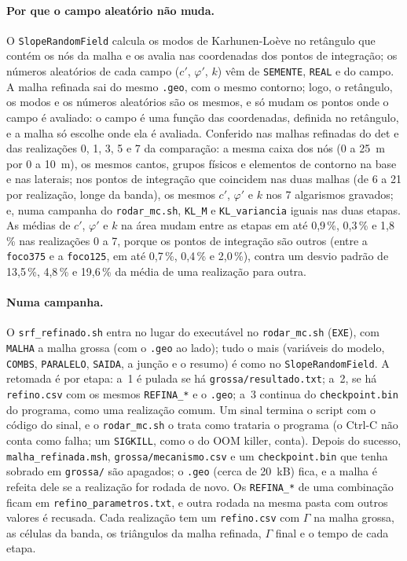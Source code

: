 \paragraph{Por que o campo aleatório não muda.} O \texttt{SlopeRandomField} calcula os modos de Karhunen-Loève no
retângulo que contém os nós da malha e os avalia nas coordenadas dos pontos de integração; os números aleatórios de
cada campo ($c'$, $\varphi'$, $k$) vêm de \texttt{SEMENTE}, \texttt{REAL} e do campo. A malha refinada sai do mesmo
\texttt{.geo}, com o mesmo contorno; logo, o retângulo, os modos e os números aleatórios são os mesmos, e só mudam os
pontos onde o campo é avaliado: o campo é uma função das coordenadas, definida no retângulo, e a malha só escolhe onde
ela é avaliada. Conferido nas malhas refinadas do det e das realizações 0, 1, 3, 5 e 7 da comparação: a mesma caixa dos
nós (0 a 25~m por 0 a 10~m), os mesmos cantos, grupos físicos e elementos de contorno na base e nas laterais; nos pontos
de integração que coincidem nas duas malhas (de 6 a 21 por realização, longe da banda), os mesmos $c'$, $\varphi'$ e
$k$ nos 7 algarismos gravados; e, numa campanha do \texttt{rodar\_mc.sh}, \texttt{KL\_M} e \texttt{KL\_variancia}
iguais nas duas etapas. As médias de $c'$, $\varphi'$ e $k$ na área mudam entre as etapas em até 0,9\,\%, 0,3\,\% e
1,8\,\% nas realizações 0 a 7, porque os pontos de integração são outros (entre a \texttt{foco375} e a
\texttt{foco125}, em até 0,7\,\%, 0,4\,\% e 2,0\,\%), contra um desvio padrão de 13,5\,\%, 4,8\,\% e 19,6\,\% da
média de uma realização para outra.

\paragraph{Numa campanha.} O \texttt{srf\_refinado.sh} entra no lugar do executável no \texttt{rodar\_mc.sh}
(\texttt{EXE}), com \texttt{MALHA} a malha grossa (com o \texttt{.geo} ao lado); tudo o mais (variáveis do modelo,
\texttt{COMBS}, \texttt{PARALELO}, \texttt{SAIDA}, a junção e o resumo) é como no \texttt{SlopeRandomField}. A
retomada é por etapa: a~1 é pulada se há \texttt{grossa/resultado.txt}; a~2, se há \texttt{refino.csv} com os mesmos
\texttt{REFINA\_*} e o \texttt{.geo}; a~3 continua do \texttt{checkpoint.bin} do programa, como uma realização comum.
Um sinal termina o script com o código do sinal, e o \texttt{rodar\_mc.sh} o trata como trataria o programa (o Ctrl-C
não conta como falha; um \texttt{SIGKILL}, como o do OOM killer, conta). Depois do sucesso, \texttt{malha\_refinada.msh},
\texttt{grossa/mecanismo.csv} e um \texttt{checkpoint.bin} que tenha sobrado em \texttt{grossa/} são apagados; o
\texttt{.geo} (cerca de 20~kB) fica, e a malha é refeita dele se a realização for rodada de novo. Os \texttt{REFINA\_*}
de uma combinação ficam em \texttt{refino\_parametros.txt}, e outra rodada na mesma pasta com outros valores é
recusada. Cada realização tem um \texttt{refino.csv} com $\Gamma$ na malha grossa, as células da banda, os triângulos
da malha refinada, $\Gamma$ final e o tempo de cada etapa.

